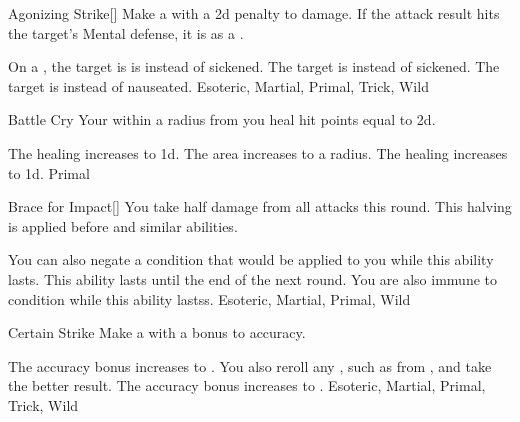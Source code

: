 
\lowercase{\hypertarget{maneuver:Agonizing Strike}{}}\label{maneuver:Agonizing Strike}
\hypertarget{maneuver:Agonizing Strike}{}
\begin{freeability}{Agonizing Strike}[]
Make a  with a \minus2d penalty to damage.
If the attack result hits the target's Mental defense,
it is  as a .

\rankline
{} On a , the target is is  instead of sickened.
 The target is  instead of sickened.
 The target is  instead of nauseated.
 Esoteric, Martial, Primal, Trick, Wild
\end{freeability}
\vspace{0.25em}



\lowercase{\hypertarget{maneuver:Battle Cry}{}}\label{maneuver:Battle Cry}
\hypertarget{maneuver:Battle Cry}{}
\begin{freeability}{Battle Cry}
Your  within a \areamed radius from you heal hit points equal to  \minus2d.

\rankline
{} The healing increases to  \minus1d.
 The area increases to a \arealarge radius.
 The healing increases to  \plus1d.
 Primal
\end{freeability}
\vspace{0.25em}



\lowercase{\hypertarget{maneuver:Brace for Impact}{}}\label{maneuver:Brace for Impact}
\hypertarget{maneuver:Brace for Impact}{}
\begin{freeability}{Brace for Impact}[]
You take half damage from all attacks this round.
This halving is applied before  and similar abilities.

\rankline
{} You can also negate a condition that would be applied to you while this ability lasts.
 This ability lasts until the end of the next round.
 You are also immune to condition while this ability lastss.
 Esoteric, Martial, Primal, Wild
\end{freeability}
\vspace{0.25em}



\lowercase{\hypertarget{maneuver:Certain Strike}{}}\label{maneuver:Certain Strike}
\hypertarget{maneuver:Certain Strike}{}
\begin{freeability}{Certain Strike}
Make a  with a  bonus to accuracy.

\rankline
{} The accuracy bonus increases to .
 You also reroll any , such as from , and take the better result.
 The accuracy bonus increases to .
 Esoteric, Martial, Primal, Trick, Wild
\end{freeability}
\vspace{0.25em}



